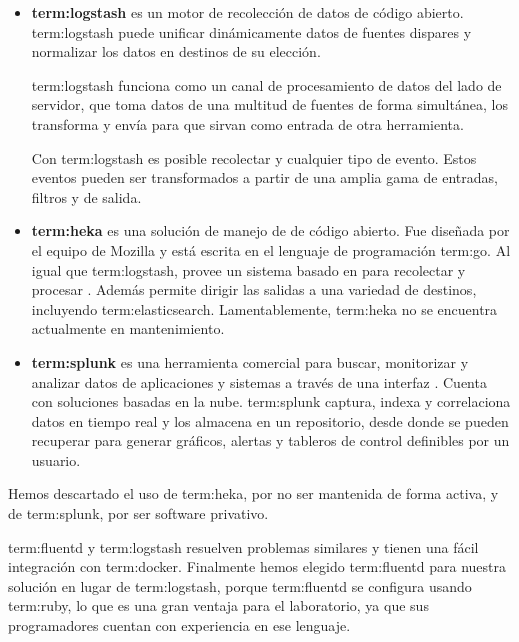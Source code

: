 \begin{itemize}

\item
\textbf{\gls{term:logstash}} es un motor de recolección de datos de código abierto.
\gls{term:logstash} puede unificar dinámicamente datos de fuentes dispares y
normalizar los datos en destinos de su elección.

\gls{term:logstash} funciona como un canal de procesamiento de datos del lado
de servidor, que toma datos de una multitud de fuentes de forma simultánea, los
transforma y envía para que sirvan como entrada de otra herramienta.

Con \gls{term:logstash} es posible recolectar  y cualquier tipo de evento.
Estos eventos pueden ser transformados a partir de una amplia gama de entradas,
filtros y  de salida.

\item
\textbf{\gls{term:heka}} es una solución de manejo de  de código abierto. Fue
diseñada por el equipo de Mozilla y está escrita en el lenguaje de programación
\gls{term:go}. Al igual que \gls{term:logstash}, provee un sistema basado en
 para recolectar y procesar . Además permite dirigir las
salidas a una variedad de destinos, incluyendo \gls{term:elasticsearch}.
Lamentablemente, \gls{term:heka} no se encuentra actualmente en mantenimiento.

\item
\textbf{\gls{term:splunk}} es una herramienta comercial para buscar, monitorizar y
analizar datos de aplicaciones y sistemas a través de una interfaz
. Cuenta con soluciones basadas en la nube. \gls{term:splunk}
captura, indexa y correlaciona datos en tiempo real y los almacena en un
repositorio, desde donde se pueden recuperar para generar gráficos, alertas y
tableros de control definibles por un usuario.

\end{itemize}

Hemos descartado el uso de \gls{term:heka}, por no ser mantenida de forma
activa, y de \gls{term:splunk}, por ser software privativo.

\gls{term:fluentd} y \gls{term:logstash} resuelven problemas similares y tienen
una fácil integración con \gls{term:docker}. Finalmente hemos elegido
\gls{term:fluentd} para nuestra solución en lugar de \gls{term:logstash},
porque \gls{term:fluentd} se configura usando \gls{term:ruby}, lo que es una
gran ventaja para el laboratorio, ya que sus programadores cuentan con
experiencia en ese lenguaje.

